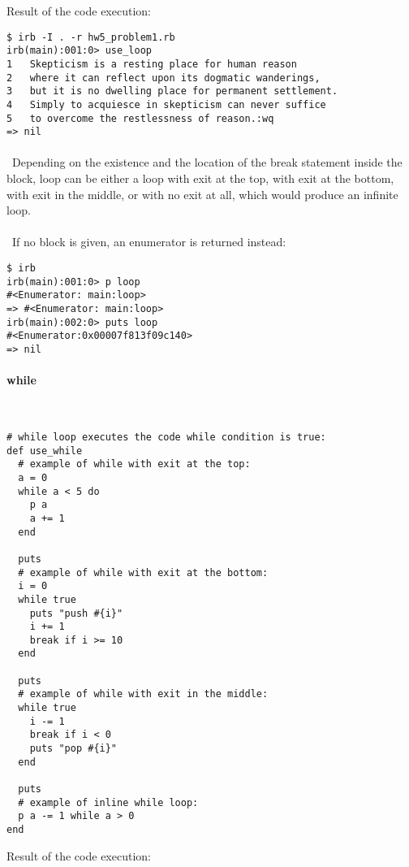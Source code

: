 \documentclass{article}
\begin{document}
Result of the code execution:

\begin{verbatim} 
$ irb -I . -r hw5_problem1.rb
irb(main):001:0> use_loop
1	Skepticism is a resting place for human reason
2	where it can reflect upon its dogmatic wanderings,
3	but it is no dwelling place for permanent settlement.
4	Simply to acquiesce in skepticism can never suffice
5	to overcome the restlessness of reason.:wq
=> nil
\end{verbatim}

\paragraph{}\
Depending on the existence and the location of the break statement inside the block, loop can be either a loop with exit at the top, with exit at the bottom, with exit in the middle, or with no exit at all, which would produce an infinite loop. 
\paragraph{}\
If no block is given, an enumerator is returned instead:
\begin{verbatim} 
$ irb
irb(main):001:0> p loop
#<Enumerator: main:loop>
=> #<Enumerator: main:loop>
irb(main):002:0> puts loop
#<Enumerator:0x00007f813f09c140>
=> nil
\end{verbatim}

\paragraph{ while}\

\begin{verbatim}
# while loop executes the code while condition is true:
def use_while
  # example of while with exit at the top:
  a = 0
  while a < 5 do
    p a
    a += 1
  end

  puts
  # example of while with exit at the bottom:
  i = 0
  while true
    puts "push #{i}"
    i += 1
    break if i >= 10
  end

  puts
  # example of while with exit in the middle:
  while true
    i -= 1
    break if i < 0
    puts "pop #{i}"
  end
  
  puts
  # example of inline while loop:
  p a -= 1 while a > 0
end
\end{verbatim}

Result of the code execution:
\end{document}
